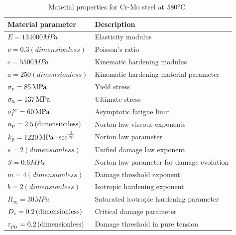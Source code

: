 \begin{table}[hbt!]
	\caption{Material properties for Cr-Mo steel at $580^\circ \rm C$.}
	\label{tab:mat_pro2}
	\centering
	\begin{tabular}{ll}
		\toprule
		\textbf{Material parameter}                           & \textbf{Description}                      \\
		\midrule
		$E = 134000\unit{MPa}$                                & Elasticity modulus                        \\
		$\nu = 0.3\unit{(dimensionless)} $                    & Poisson's ratio                           \\
		$c = 5500\unit{MPa}$                                  & Kinematic hardening modulus               \\
		$ a=250\unit{(dimensionless)}$                        & Kinematic hardening material parameter    \\
		$ \sigma_{\rm y} = 85\,{\rm MPa}$                      & Yield stress                              \\
		$ \sigma_{\rm u} = 137\,{\rm MPa}$                     & Ultimate stress                           \\
		$ \sigma_{\rm f}^\infty = 60\,{\rm MPa} $              & Asymptotic fatigue limit                  \\
		$ {n_{\rm p}}=2.5\,{\rm (dimensionless)} $                     & Norton law viscous exponents              \\
		$ k_{\rm p}=1220\,{\rm MPa \cdot sec^\frac{1}{{n_{\rm p}}}} $        & Norton law parameter                      \\
		$s = 2\unit{(dimensionless)}$                         & Unified damage law exponent               \\
		$S = 0.6\unit{MPa}$                                   & Norton law parameter for damage evolution \\
		$m = 4\unit{(dimensionless)}$                         & Damage threshold exponent                 \\
		$b = 2\unit{(dimensionless)}$                         & Isotropic hardening exponent              \\
		$R_\infty = 30\unit{MPa} $                            & Saturated isotropic hardening parameter   \\
		$D_{\rm c} = 0.2\,{\rm (dimensionless)}$               & Critical damage parameter                 \\
		$\varepsilon_{p_{\rm D}} = 0.2\,{\rm (dimensionless)}$ & Damage threshold in pure tension          \\
		\bottomrule
	\end{tabular}
\end{table}
